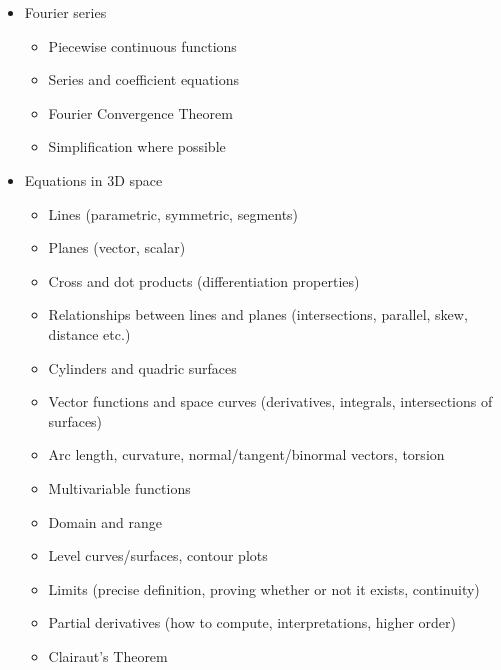 \documentclass[11pt]{article}
\begin{document}
{\begin{itemize}
\item Fourier series
\begin{itemize}
\item Piecewise continuous functions
\item Series and coefficient equations
\item Fourier Convergence Theorem
\item Simplification where possible
\end{itemize}

\item Equations in 3D space
\begin{itemize}
\item Lines (parametric, symmetric, segments)
\item Planes (vector, scalar)
\item Cross and dot products (differentiation properties)
\item Relationships between lines and planes (intersections, parallel, skew, distance etc.)
\item Cylinders and quadric surfaces
\item Vector functions and space curves (derivatives, integrals, intersections of surfaces)
\item Arc length, curvature, normal/tangent/binormal vectors, torsion
\item Multivariable functions
\item Domain and range
\item Level curves/surfaces, contour plots
\item Limits (precise definition, proving whether or not it exists, continuity)
\item Partial derivatives (how to compute, interpretations, higher order)
\item Clairaut’s Theorem
\end{itemize}
\end{itemize}

}
\end{document}
